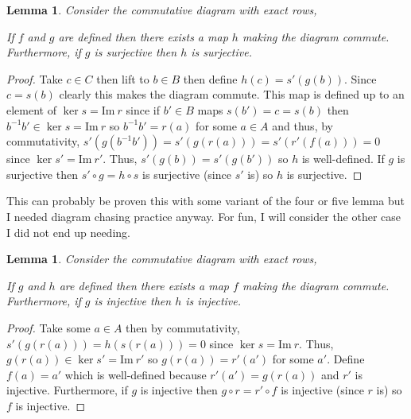 \documentclass{article}
\renewcommand{\Im}{\mathrm{Im} \: }
\newtheorem{lemma}[theorem]{Lemma}
\theoremstyle{definition}
\theoremstyle{definition}
\theoremstyle{remark}
\begin{document}
\begin{lemma} \label{lem:three_surjective}
Consider the commutative diagram with exact rows, 
\begin{center}
\end{center}
If $f$ and $g$ are defined then there exists a map $h$ making the diagram commute. Furthermore, if $g$ is surjective then $h$ is surjective. 
\end{lemma}

\begin{proof}
Take $c \in C$ then lift to $b \in B$ then define $h(c) = s'(g(b))$. Since $c = s(b)$ clearly this makes the diagram commute. This map is defined up to an element of $\ker{s} = \Im{r}$ since if $b' \in B$ maps $s(b') = c = s(b)$ then $b^{-1}b' \in \ker{s} = \Im{r}$ so $b^{-1}b' = r(a)$ for some $a \in A$ and thus, by commutativity, $s'(g(b^{-1}b')) = s'(g(r(a))) = s'(r'(f(a))) = 0$ since $\ker{s'} = \Im{r'}$. Thus, $s'(g(b)) = s'(g(b'))$ so $h$ is well-defined. If $g$ is surjective then $s' \circ g = h \circ s$ is surjective (since $s'$ is) so $h$ is surjective. 
\end{proof}

This can probably be proven this with some variant of the four or five lemma but I needed diagram chasing practice anyway. For fun, I will consider the other case I did not end up needing. 

\begin{lemma} \label{lem:three_injective}
Consider the commutative diagram with exact rows, 
\begin{center}
\end{center}
If $g$ and $h$ are defined then there exists a map $f$ making the diagram commute. Furthermore, if $g$ is injective then $h$ is injective. 
\end{lemma}

\begin{proof}
Take some $a \in A$ then by commutativity, $s'(g(r(a))) = h(s(r(a))) = 0$ since $\ker{s} = \Im{r}$. Thus, $g(r(a)) \in \ker{s'} = \Im{r'}$ so $g(r(a)) = r'(a')$ for some $a'$. Define $f(a) = a'$ which is well-defined because $r'(a') = g(r(a))$ and $r'$ is injective. Furthermore, if $g$ is injective then $g \circ r = r' \circ f$ is injective (since $r$ is) so $f$ is injective. 
\end{proof}
\end{document}
